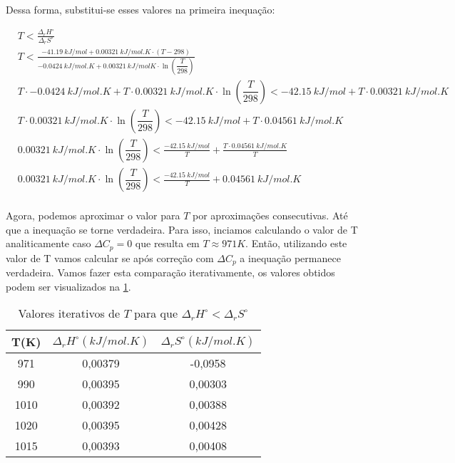 Dessa forma, substitui-se esses valores na primeira inequação:

\begin{align*}
    &T < \frac{\Delta_rH^\circ}{\Delta_rS^\circ}\\ 
    &T < \frac{\qty{-41,19}{kJ \per mol } +\qty{0,00321}{kJ \per mol . K} \cdot
    (T - 298)}{\qty{-0,0424}{kJ \per mol . K} +\qty{0,00321}{kJ \per mol K}
    \cdot \ln (\dfrac{T}{298})} \\  
    &T \cdot \qty{-0,0424}{kJ \per mol . K} + T \cdot
        \qty{0,00321}{kJ \per mol . K} \cdot  \ln (\dfrac{T}{298}) <
    \qty{-42,15}{kJ \per mol } + T \cdot \qty{0,00321}{kJ \per mol . K} \\
    &T \cdot \qty{0,00321}{kJ \per mol . K} \cdot \ln (\dfrac{T}{298}) <
       \qty{-42,15}{kJ \per mol } + T \cdot \qty{0,04561}{kJ \per mol . K}\\
    &\qty{0,00321}{kJ \per mol . K} \cdot \ln (\dfrac{T}{298}) <
    \frac{\qty{-42,15}{kJ \per mol }}{T}  + \frac{T \cdot \qty{0,04561}{kJ \per mol . K}}{T} \\
    &\qty{0,00321}{kJ \per mol . K} \cdot \ln (\dfrac{T}{298}) <
    \frac{\qty{-42,15}{kJ \per mol }}{T}  + \qty{0,04561}{kJ \per mol . K} \\
\end{align*}

 Agora, podemos aproximar o valor para \( T \) por aproximações
 consecutivas. Até que a inequação se torne verdadeira. Para
 isso, inciamos calculando o valor de T analiticamente caso \( \Delta C_p = 0 \)
 que resulta em \(T \approx 971 K\). Então, utilizando este valor de T vamos
 calcular se após correção com \( \Delta C_p \) a inequação permanece
 verdadeira. Vamos fazer esta comparação iterativamente, os valores obtidos
 podem ser visualizados na \cref{programafoda}. 

 \begin{table}[H]
     \centering
 \begin{tabular}{c c c}
     \hline
     T(\unit{K}) & \( \Delta_r H^\circ (\unit{kJ \per mol.K}) \) & \(
     \Delta_r S^\circ (\unit{kJ \per mol.K}) \)\\
     \hline
     971 & 0,00379 & -0,0958 \\
     990 & 0,00395 & 0,00303 \\
     1010 & 0,00392 &  0,00388 \\
     1020 & 0,00395 & 0,00428 \\
     1015 & 0,00393 & 0,00408 \\ 
     \hline
 \end{tabular}
 \caption{Valores iterativos de \( T \) para que \( \Delta_r H^\circ < \Delta_r
 S^\circ \)}  
 \label{programafoda}
\end{table}
 
